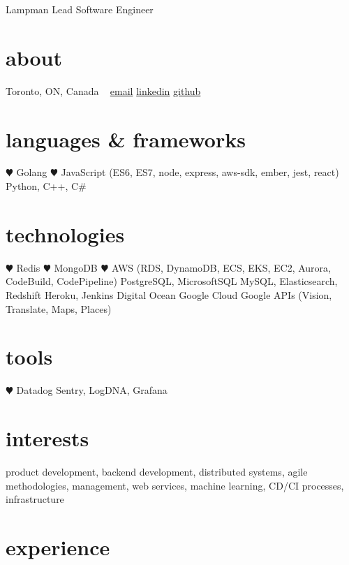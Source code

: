 \documentclass[]{cv}
\begin{document}
 {Lampman}
       {Lead Software Engineer}


\begin{aside}
  \section{about}
    Toronto, ON,
    Canada
    ~
    \href{mailto:dan.lampman@gmail.com}{email}
    \href{https://linkedin.com/in/danlampman}{linkedin}
    \href{https://github.com/dan-lampman}{github}
  \section{languages \& frameworks}
    {\color{red} $\varheartsuit$} Golang
    {\color{red} $\varheartsuit$} JavaScript
    (ES6, ES7, node, express, aws-sdk, ember, jest, react)
    Python, C++, C\#
\section{technologies}
    {\color{red} $\varheartsuit$} Redis
    {\color{red} $\varheartsuit$} MongoDB
    {\color{red} $\varheartsuit$} AWS
    (RDS, DynamoDB, ECS, EKS, EC2, Aurora, CodeBuild, CodePipeline)
    PostgreSQL, MicrosoftSQL
    MySQL,
    Elasticsearch, Redshift
    Heroku, Jenkins
    Digital Ocean
    Google Cloud
    Google APIs
    (Vision, Translate, Maps, Places)
\section{tools}
    {\color{red} $\varheartsuit$} Datadog
    Sentry, LogDNA, Grafana
\end{aside}

\section{interests}

product development, backend development, distributed systems, agile methodologies, management, web services, machine learning,
CD/CI processes, infrastructure

\section{experience}
\end{document}
